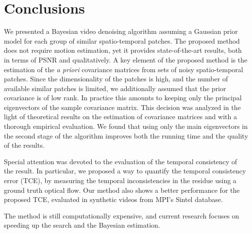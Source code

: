 \documentclass[10pt, journal, twocolumn, final, a4paper]{IEEEtran}
\begin{document}
\section{Conclusions}
\label{sec:conclusion}

We presented a Bayesian video denoising algorithm assuming a Gaussian prior
model for each group of similar spatio-temporal patches. 
The proposed method does not require motion estimation, yet it provides 
state-of-the-art results, both in terms of PSNR and qualitatively. 
A key element of the proposed method is the estimation of the \textit{a priori}
covariance matrices from sets of noisy spatio-temporal patches. Since
the dimensionality of the patches is high, and the number of available 
similar patches is limited, we additionally assumed that the prior covariance
is of low rank. In practice this amounts to keeping only the principal 
eigenvectors of the sample covariance matrix. This decision was analyzed
in the light of theoretical results on the estimation of covariance matrices 
and with a thorough empirical evaluation. We found that using only the 
main eigenvectors in the second stage of the algorithm improves both
the running time and the quality of the results.

Special attention was devoted to the evaluation of the temporal consistency of
the result. In particular, we proposed a way to quantify the temporal
consistency error (TCE), by measuring the temporal inconsistencies in the
residue using a ground truth optical flow. Our method also shows a better performance
for the proposed TCE, evaluated in synthetic videos from MPI's Sintel
database.

The method is still computationally expensive, and current research focuses
on speeding up the search and the Bayesian estimation.

%
%



\end{document}
